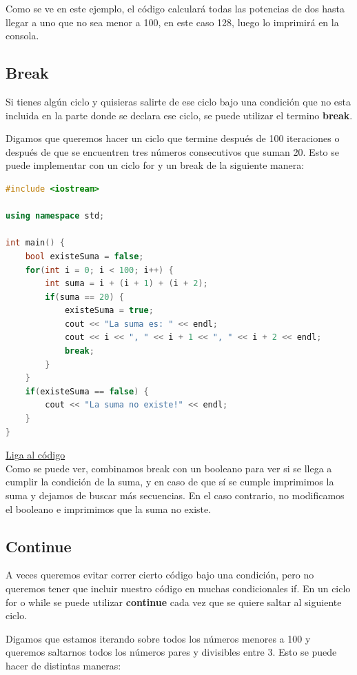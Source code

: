 \documentclass{article}
\begin{document}
Como se ve en este ejemplo, el código calculará todas las potencias de dos hasta llegar a uno que no sea menor a 100, en este caso 128, luego lo imprimirá en la consola.

\subsection{Break}

Si tienes algún ciclo y quisieras salirte de ese ciclo bajo una condición que no esta incluida en la parte donde se declara ese ciclo, se puede utilizar el termino \textbf{break}.

Digamos que queremos hacer un ciclo que termine después de 100 iteraciones o después de que se encuentren tres números consecutivos que suman 20. Esto se puede implementar con un ciclo for y un break de la siguiente manera:

\begin{lstlisting}[language=C++, caption=Break]
#include <iostream>

using namespace std;

int main() {
    bool existeSuma = false;
    for(int i = 0; i < 100; i++) {
        int suma = i + (i + 1) + (i + 2);
        if(suma == 20) {
            existeSuma = true;
            cout << "La suma es: " << endl;
            cout << i << ", " << i + 1 << ", " << i + 2 << endl;
            break;
        }
    }
    if(existeSuma == false) {
        cout << "La suma no existe!" << endl;
    }
}
\end{lstlisting}
\href{https://repl.it/@Jamesscn/Suma-Triple}{Liga al código}\\

Como se puede ver, combinamos break con un booleano para ver si se llega a cumplir la condición de la suma, y en caso de que sí se cumple imprimimos la suma y dejamos de buscar más secuencias. En el caso contrario, no modificamos el booleano e imprimimos que la suma no existe.

\subsection{Continue}

A veces queremos evitar correr cierto código bajo una condición, pero no queremos tener que incluir nuestro código en muchas condicionales if. En un ciclo for o while se puede utilizar \textbf{continue} cada vez que se quiere saltar al siguiente ciclo.

Digamos que estamos iterando sobre todos los números menores a 100 y queremos saltarnos todos los números pares y divisibles entre 3. Esto se puede hacer de distintas maneras:
\end{document}
